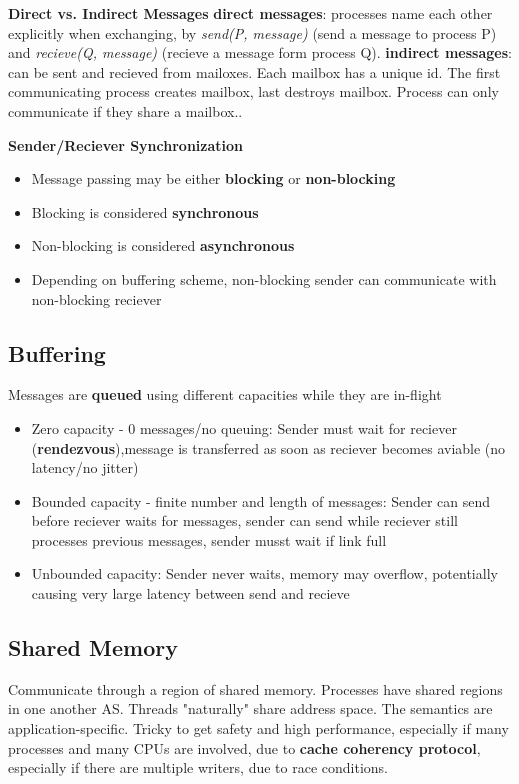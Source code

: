 \documentclass[11pt,a4paper]{article}
\begin{document}
	\textbf{Direct vs. Indirect Messages} \newline
	\textbf{direct messages}: processes name each other explicitly when exchanging, by \textit{send(P, message)} (send a message to process P) and \textit{recieve(Q, message)} (recieve a message form process Q). \newline
	\textbf{indirect messages}: can be sent and recieved from mailoxes. Each mailbox has a unique id. The first communicating process creates mailbox, last destroys mailbox. Process can only communicate if they share a mailbox.. \newline
	
	\textbf{Sender/Reciever Synchronization}
	\begin{itemize}
		\item Message passing may be either \textbf{blocking} or \textbf{non-blocking}
		\item Blocking is considered \textbf{synchronous}
		\item Non-blocking is considered \textbf{asynchronous}
		\item Depending on buffering scheme, non-blocking sender can communicate with non-blocking reciever
	\end{itemize}

	\subsection{Buffering}
	Messages are \textbf{queued} using different capacities while they are in-flight
	\begin{itemize}
		\item Zero capacity - 0 messages/no queuing: Sender must wait for reciever (\textbf{rendezvous}),message is transferred as soon as reciever becomes aviable (no latency/no jitter)
		\item Bounded capacity - finite number and length of messages: Sender can send before reciever waits for messages, sender can send while reciever still processes previous messages, sender musst wait if link full
		\item Unbounded capacity: Sender never waits, memory may overflow, potentially causing very large latency between send and recieve
	\end{itemize}
	
	\subsection{Shared Memory}
	Communicate through a region of shared memory. Processes have shared regions in one another AS. Threads "naturally" share address space. The semantics are application-specific. \newline
	Tricky to get safety and high performance, especially if many processes and many CPUs are involved, due to \textbf{cache coherency protocol}, especially if there are multiple writers, due to {race conditions}. \newline
	
\end{document}
